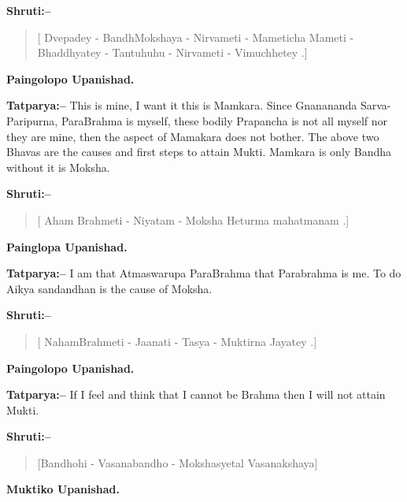 \textbf{Shruti:–}

\begin{verse}
[ Dvepadey - BandhMokshaya - Nirvameti - Mame\break ticha  Mameti - Bhaddhyatey - Tantuhuhu - Nirvameti - Vimuchhetey .]
\end{verse}

\begin{flushright}
\textbf{Paingolopo Upanishad.}
\end{flushright}

\textbf{Tatparya:–} This is mine, I want it this is Mamkara. Since Gnanananda Sarva-Paripurna, ParaBrahma is myself, these bodily Prapancha is not all myself nor they are mine, then the aspect of Mamakara does not bother. The above two Bhavas are the causes and first steps to attain Mukti. Mamkara is only Bandha without it is Moksha.

\newpage

\textbf{Shruti:–}

\begin{verse}
[ Aham Brahmeti - Niyatam - Moksha Heturma mahatmanam .]
\end{verse}

\begin{flushright}
\textbf{Painglopa Upanishad.}
\end{flushright}

\textbf{Tatparya:–} I am that Atmaswarupa ParaBrahma that Parabrahma is me. To do Aikya sandandhan is the cause of Moksha.

\textbf{Shruti:–}

\begin{verse}
[ NahamBrahmeti - Jaanati - Tasya - Muktirna Jayatey .]
\end{verse}

\begin{flushright}
\textbf{Paingolopo Upanishad.}
\end{flushright}

\textbf{Tatparya:–} If I feel and think that I cannot be Brahma then I will not attain Mukti.

\textbf{Shruti:–}

\begin{verse}
[Bandhohi - Vasanabandho - Mokshasyetal Vasanakshaya]
\end{verse}

\begin{flushright}
\textbf{Muktiko Upanishad.}
\end{flushright}

